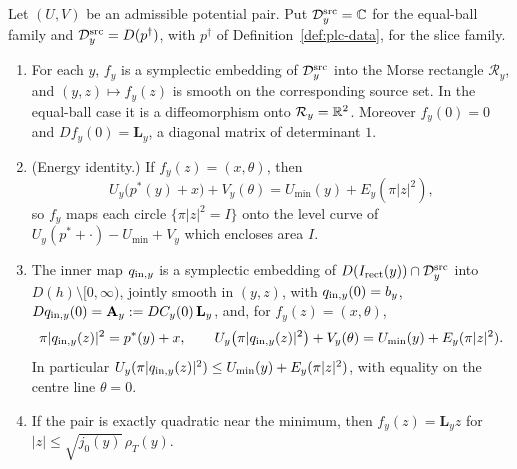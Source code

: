 \begin{theorem}\label{thm:pln-inner}
Let $(U,V)$ be an admissible potential pair. Put $\mathcal D_y^{\rm src}=\mathbb{C}$ for the equal-ball family and
$\mathcal D_y^{\rm src}=D(p^\dagger)$, with $p^\dagger$ of Definition~\ref{def:plc-data}, for the slice family.
\begin{enumerate}[label=(\alph*)]
\item For each $y$, $f_y$ is a symplectic embedding of $\mathcal D_y^{\rm src}$ into the Morse rectangle
 $\mathcal R_y$, and $(y,z)\mapsto f_y(z)$ is smooth on the corresponding source set. In the equal-ball case it is a diffeomorphism onto $\mathcal R_y=\mathbb{R}^2$. Moreover
 $f_y(0)=0$ and $Df_y(0)=\mathbf L_y$, a diagonal matrix of determinant $1$.
\item (Energy identity.) If $f_y(z)=(x,\theta)$, then
 \[
  U_y\bigl(p^*(y)+x\bigr)+V_y(\theta)=U_{\min}(y)+E_y(\pi|z|^2),
 \]
 so $f_y$ maps each circle $\{\pi|z|^2=I\}$ onto the level curve of $U_y(p^*+\cdot)-U_{\min}+V_y$ which encloses area $I$.
\item The inner map $q_{{\rm in},y}$ is a symplectic embedding of $D(I_{\rm rect}(y))\cap\mathcal D_y^{\rm src}$ into
 $D(h)\setminus[0,\infty)$, jointly smooth in $(y,z)$, with $q_{{\rm in},y}(0)=b_y$,
 $Dq_{{\rm in},y}(0)=\mathbf A_y:=DC_y(0)\,\mathbf L_y$, and, for $f_y(z)=(x,\theta)$,
 \[
  \pi|q_{{\rm in},y}(z)|^2=p^*(y)+x,\qquad
  U_y\bigl(\pi|q_{{\rm in},y}(z)|^2\bigr)+V_y(\theta)=U_{\min}(y)+E_y(\pi|z|^2).
 \]
 In particular $U_y(\pi|q_{{\rm in},y}(z)|^2)\le U_{\min}(y)+E_y(\pi|z|^2)$, with equality on the centre line $\theta=0$.
\item If the pair is exactly quadratic near the minimum, then $f_y(z)=\mathbf L_yz$ for
 $|z|\le\sqrt{j_0(y)}\,\rho_T(y)$.
\end{enumerate}
\end{theorem}

